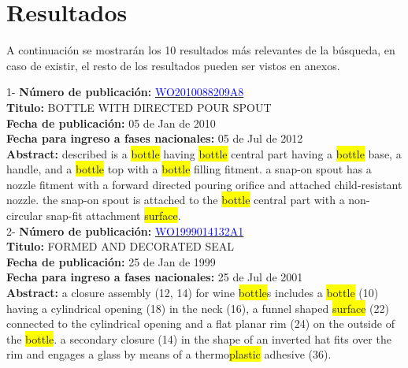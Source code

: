 \chapter{Resultados}
 A continuación se mostrarán los 10 resultados más 
    relevantes de la búsqueda, en caso de existir, el resto de los resultados pueden ser vistos en anexos.
 
 \vspace{1cm}1- \textbf{Número de publicación:} \href{https://worldwide.espacenet.com/publicationDetails/biblio?DB=EPODOC&II=0&ND=3&adjacent=true&locale=en_EP&FT=D&date=20160331&CC=WO&NR=2010088209A8&KC=A8#}{\textcolor{blue}{WO2010088209A8}}\\ 
\textbf{Titulo:} BOTTLE WITH DIRECTED POUR SPOUT\\ 
 
\textbf{Fecha de publicación:} 05 de Jan de 2010\\ 
\textbf{Fecha para ingreso a fases nacionales:} 05 de Jul de 2012\\ 
\textbf{Abstract:} described is a \colorbox{yellow}{bottle} having \colorbox{yellow}{bottle} central part having a \colorbox{yellow}{bottle} base, a handle, and a \colorbox{yellow}{bottle} top with a \colorbox{yellow}{bottle} filling fitment. a snap-on spout has a nozzle fitment with a forward directed pouring orifice and attached child-resistant nozzle. the snap-on spout is attached to the \colorbox{yellow}{bottle} central part with a non-circular snap-fit attachment \colorbox{yellow}{surface}.\\ 
 

 \vspace{1cm}2- \textbf{Número de publicación:} \href{https://worldwide.espacenet.com/publicationDetails/biblio?DB=EPODOC&II=0&ND=3&adjacent=true&locale=en_EP&FT=D&date=20160331&CC=WO&NR=1999014132A1&KC=A1#}{\textcolor{blue}{WO1999014132A1}}\\ 
\textbf{Titulo:} FORMED AND DECORATED SEAL\\ 
 
\textbf{Fecha de publicación:} 25 de Jan de 1999\\ 
\textbf{Fecha para ingreso a fases nacionales:} 25 de Jul de 2001\\ 
\textbf{Abstract:} a closure assembly (12, 14) for wine \colorbox{yellow}{bottle}s includes a \colorbox{yellow}{bottle} (10) having a cylindrical opening (18) in the neck (16), a funnel shaped \colorbox{yellow}{surface} (22) connected to the cylindrical opening and a flat planar rim (24) on the outside of the \colorbox{yellow}{bottle}. a secondary closure (14) in the shape of an inverted hat fits over the rim and engages a glass by means of a thermo\colorbox{yellow}{plastic} adhesive (36).\\ 
 

